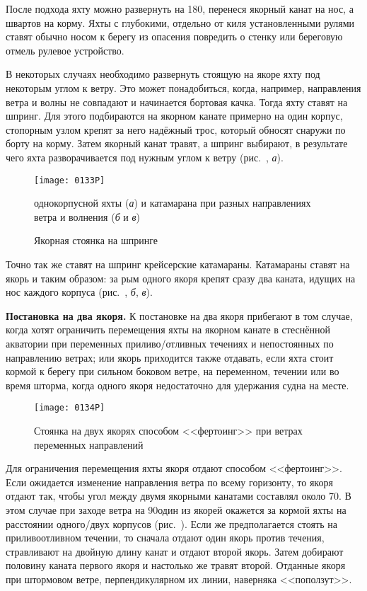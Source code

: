 После подхода яхту можно развернуть на 180\gr, перенеся якорный канат на нос, а швартов на корму. Яхты с глубокими, отдельно от киля установленными рулями ставят обычно носом к берегу из опасения повредить о стенку или береговую отмель рулевое устройство.

В некоторых случаях необходимо развернуть стоящую на якоре яхту под некоторым углом к ветру. Это может понадобиться, когда, например, направления ветра и волны не совпадают и начинается бортовая качка. Тогда яхту ставят на шпринг. Для этого подбираются на якорном канате примерно на один корпус, стопорным узлом крепят за него надёжный трос, который обносят снаружи по борту на корму. Затем якорный канат травят, а шпринг выбирают, в результате чего яхта разворачивается под нужным углом к ветру (рис.~, \textit{а}).

\begin{figure*}[htb]
  \centering{}
  \texttt{[image: 0133P]}
  \caption{Якорная стоянка на шпринге}
  \label{fig:133}
  \small
  \centering{}
  однокорпусной яхты (\textit{а}) и катамарана при разных направлениях ветра и волнения (\textit{б} и \textit{в})
\end{figure*}

Точно так же ставят на шпринг крейсерские катамараны. Катамараны ставят на якорь и таким образом: за рым одного якоря крепят сразу два каната, идущих на нос каждого корпуса (рис.~, \textit{б}, \textit{в}). 

\textbf{Постановка на два якоря.} К постановке на два якоря прибегают в том случае, когда хотят ограничить перемещения яхты на якорном канате в стеснённой акватории при переменных приливо\-/отливных течениях и непостоянных по направлению ветрах; или якорь приходится также отдавать, если яхта стоит кормой к берегу при сильном боковом ветре, на переменном, течении или во время шторма, когда одного якоря недостаточно для удержания судна на месте.

\begin{figure*}[htb]
  \centering{}
  \texttt{[image: 0134P]}
  \caption{Стоянка на двух якорях способом <<фертоинг>> при ветрах переменных направлений}
  \label{fig:134}
\end{figure*}

Для ограничения перемещения яхты якоря отдают способом <<фертоинг>>. Если ожидается изменение направления ветра по всему горизонту, то якоря отдают так, чтобы угол между двумя якорными канатами составлял около 70\gr. В этом случае при заходе ветра на 90\gr один из якорей окажется за кормой яхты на расстоянии одного\-/двух корпусов (рис.~). Если же предполагается стоять на приливоотливном течении, то сначала отдают один якорь против течения, стравливают на двойную длину канат и отдают второй якорь. Затем добирают половину каната первого якоря и настолько же травят второй. Отданные якоря при штормовом ветре, перпендикулярном их линии, наверняка <<поползут>>.

